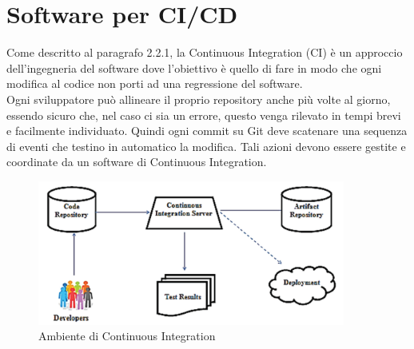 \documentclass[a4paper, 12pt]{report}
\numberwithin{equation}{section}
\begin{document}
\section{Software per CI/CD}
Come descritto al paragrafo 2.2.1, la Continuous Integration (CI) è un approccio dell’ingegneria del software dove l’obiettivo è quello di fare in modo che ogni modifica al codice non porti ad una regressione del software.\\
Ogni sviluppatore può allineare il proprio repository anche più volte al giorno, essendo sicuro che, nel caso ci sia un errore, questo venga rilevato in tempi brevi e facilmente individuato. Quindi ogni commit su Git deve scatenare una sequenza di eventi che testino in automatico la modifica. Tali azioni devono essere gestite e coordinate da un software di Continuous Integration.
\begin{figure}
    \centering
    \includegraphics[width=0.9\textwidth]{imgs/ambiente-ci.png}
    \caption{Ambiente di Continuous Integration \cite{ci-env}}
    \label{fig:ambiente-ci}
\end{figure}
\end{document}
